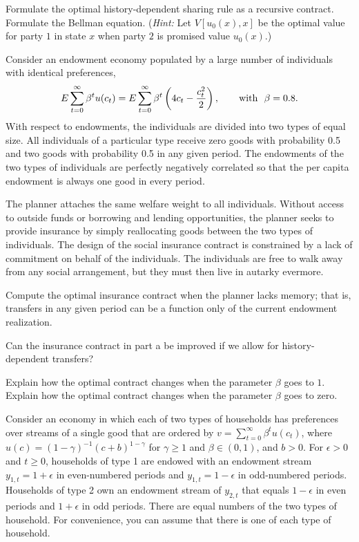   Formulate the optimal history-dependent sharing rule as a
recursive contract.  Formulate the Bellman equation.
({\it Hint:} Let $V[u_0(x),x]$ be the optimal value for party $1$ in
state $x$ when party $2$ is promised value $u_0(x)$.)

\medskip
{}
\medskip
\noindent
Consider an endowment economy populated by a large number of individuals
with identical preferences,
$$
E \sum_{t=0}^\infty \beta^t u(c_t) =
E \sum_{t=0}^\infty \beta^t \left(4 c_t - {c_t^2 \over 2}\right),
\qquad \hbox{with} \ \ \beta=0.8.
$$
With respect to endowments, the individuals are divided into two types of
equal size.  All individuals of a particular type receive zero goods with
probability 0.5 and two goods with probability 0.5 in any given period.
The endowments of the two types of individuals are perfectly
negatively correlated so that the per capita endowment is always one good in
every period.

The planner attaches the same welfare weight to all individuals.
Without access to outside funds or borrowing and lending
opportunities, the planner seeks to provide insurance by simply
reallocating goods between the two types of individuals. The
design of the social insurance contract is constrained by a lack
of commitment on behalf of the individuals. The individuals are
free to walk away from any social arrangement, but they must then
live in autarky evermore.

\medskip
{}   Compute the optimal insurance contract when
the planner lacks memory; that is, transfers in any given period
can be a function only of the current endowment realization.

\medskip
{} Can the insurance contract in part a be
improved if we allow for history-dependent transfers?

\medskip
{}  Explain how the optimal contract changes when the
parameter $\beta$ goes to $1$. Explain how the optimal contract
changes when the parameter $\beta$ goes to zero.

\medskip
{} 

\medskip
\noindent Consider an economy in which each of two types
of households has preferences over streams of
a single good that are ordered by
$ v= \sum_{t=0}^\infty \beta^t u(c_t) $, where
$u(c) = (1-\gamma)^{-1} (c+b)^{1-\gamma}$ for $\gamma \geq 1$ and
$\beta \in (0,1)$, and $b>0$.
For $\epsilon >0$ and $t\geq 0$,
households of type 1 are endowed with an endowment stream
$y_{1,t} = 1+\epsilon$ in even-numbered periods and
$y_{1,t}=1-\epsilon$ in odd-numbered periods.  Households
of type 2 own an endowment stream of  $y_{2,t}$ that
equals $1-\epsilon$ in even periods and $1+\epsilon$ in
odd periods.  There are equal numbers of the two types of household.
For convenience, you can assume that there is one of each type of
household.

